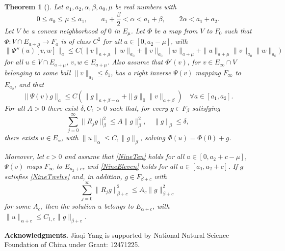 \documentclass[12pt]{amsart}
\newtheorem{theorem}{Theorem}[section]
\theoremstyle{remark}
\theoremstyle{definition}
\numberwithin{equation}{section}
\begin{document}
\begin{theorem}[\hspace{1sp}\cite{MR3711883}] \label{t:Nash}
 Let $a_1, a_2, \alpha, \beta, a_0, \mu$ be real numbers with
\begin{equation*}
    0 \leq a_0 \leq \mu \leq a_1, \qquad a_1 + \frac{\beta}{2} < \alpha < a_1 + \beta, \qquad 2\alpha < a_1 + a_2. 
\end{equation*}
Let $V$ be a convex neighborhood of $0$ in $E_\mu$. Let $\Phi$ be a map from $V$ to $F_0$ such that $\Phi : V \cap E_{a+\mu} \to F_a$ is of class $C^2$ for all $a \in [0, a_2 - \mu]$, with
\begin{equation} \label{NineTen}
    \|\Phi''(u)[v, w]\|_a \leq C \big(\|v\|_{a+\mu}\|w\|_{a_0} + \|v\|_{a_0}\|w\|_{a+\mu} + \|u\|_{a+\mu}\|v\|_{a_0}\|w\|_{a_0}\big) 
\end{equation}
for all $u \in V \cap E_{a+\mu}$, $v, w \in E_{a+\mu}$. Also assume that $\Phi'(v)$, for $v \in E_\infty \cap V$ belonging to some ball $\|v\|_{a_1} \leq \delta_1$, has a right inverse $\Psi(v)$ mapping $F_\infty$ to $E_{a_2}$, and that
\begin{equation} \label{NineEleven}
    \|\Psi(v)g\|_a \leq C(\|g\|_{a+\beta-\alpha} + \|g\|_0 \|v\|_{a+\beta}) \quad \forall a \in [a_1, a_2]. 
\end{equation}
For all $A > 0$ there exist $\delta, C_1 > 0$ such that, for every $g \in F_\beta$ satisfying
\begin{equation} \label{NineTwelve}
    \sum_{j=0}^\infty \|R_j g\|_\beta^2 \leq A \|g\|_\beta^2, \quad \|g\|_\beta \leq \delta, 
\end{equation}
there exists $u \in E_\alpha$, with $\|u\|_\alpha \leq C_1 \|g\|_\beta$, solving $\Phi(u) = \Phi(0) + g$.

Moreover, let $c > 0$ and assume that \eqref{NineTen} holds for all $a \in [0, a_2 + c - \mu]$, $\Psi(v)$ maps $F_\infty$ to $E_{a_2+c}$, and \eqref{NineEleven} holds for all $a \in [a_1, a_2 + c]$. If $g$ satisfies \eqref{NineTwelve} and, in addition, $g \in F_{\beta+c}$ with
\begin{equation}
    \sum_{j=0}^\infty \|R_j g\|_{\beta+c}^2 \leq A_c \|g\|_{\beta+c}^2 
\end{equation}
for some $A_c$, then the solution $u$ belongs to $E_{\alpha+c}$, with $\|u\|_{\alpha+c} \leq C_{1,c} \|g\|_{\beta+c}$.
\end{theorem}
\textbf{Acknowledgments.}
Jiaqi Yang is supported by National Natural Science Foundation of China under Grant: 12471225.


	
\end{document}
